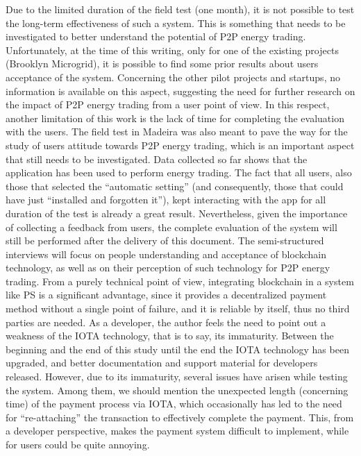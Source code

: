 Due to the limited duration of the field test (one month), it is not possible to test the long-term effectiveness of such a system. This is something that needs to be investigated to better understand the potential of P2P energy trading. Unfortunately, at the time of this writing, only for one of the existing projects (Brooklyn Microgrid), it is possible to find some prior results about users acceptance of the system. Concerning the other pilot projects and startups, no information is available on this aspect, suggesting the need for further research on the impact of P2P energy trading from a user point of view. In this respect, another limitation of this work is the lack of time for completing the evaluation with the users. The field test in Madeira was also meant to pave the way for the study of users attitude towards P2P energy trading, which is an important aspect that still needs to be investigated. Data collected so far shows that the application has been used to perform energy trading. The fact that all users, also those that selected the “automatic setting” (and consequently, those that could have just “installed and forgotten it”), kept interacting with the app for all duration of the test is already a great result. Nevertheless, given the importance of collecting a feedback from users, the complete evaluation of the system will still be performed after the delivery of this document.
The semi-structured interviews will focus on people understanding and acceptance of blockchain technology, as well as on their perception of such technology for P2P energy trading. From a purely technical point of view, integrating blockchain in a system like \ac{PS} is a significant advantage, since it provides a decentralized payment method without a single point of failure, and it is reliable by itself, thus no third parties are needed. As a developer, the author feels the need to point out a weakness of the IOTA technology, that is to say, its immaturity.  Between the beginning and the end of this study until the end the IOTA technology has been upgraded, and better documentation and support material for developers released. However, due to its immaturity, several issues have arisen while testing the system. Among them, we should mention the unexpected length (concerning time) of the payment process via IOTA, which occasionally has led to the need for “re-attaching” the transaction to effectively complete the payment. This, from a developer perspective, makes the payment system difficult to implement, while for users could be quite annoying. 


